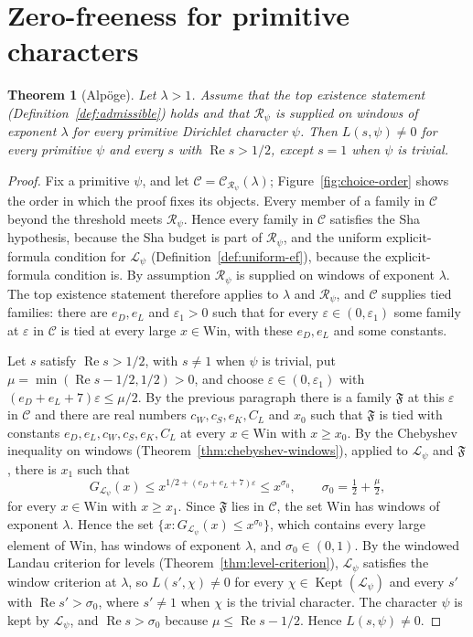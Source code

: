 \documentclass[11pt]{amsbook}
\theoremstyle{plain}
\newtheorem{theorem}{Theorem}[section]
\theoremstyle{definition}
\theoremstyle{remark}
\numberwithin{equation}{section}
\numberwithin{figure}{chapter}
\numberwithin{table}{chapter}
\newcommand{\eps}{\varepsilon}
\newcommand{\lev}{\mathscr{L}}
\newcommand{\Kept}{\operatorname{Kept}}
\newcommand{\Fam}{\mathfrak{F}}
\newcommand{\Win}{\mathrm{Win}}
\begin{document}
\section{Zero-freeness for primitive characters}

\begin{theorem}[Alp\"oge]\label{thm:zero-free-primitive}
Let $\lambda>1$. Assume that the top existence statement
(Definition~\ref{def:admissible}) holds and that
$\mathscr R_\psi$ is supplied on windows of exponent $\lambda$ for every
primitive
Dirichlet character $\psi$. Then $L(s,\psi)\ne0$ for every primitive
$\psi$ and every $s$ with $\operatorname{Re}s>1/2$, except $s=1$ when
$\psi$ is trivial.
\end{theorem}

\begin{proof}
Fix a primitive $\psi$, and let $\mathcal C=\mathcal C
_{\mathscr R_\psi}(\lambda)$; Figure~\ref{fig:choice-order} shows the order in which the proof fixes its objects. Every member of a family in
$\mathcal C$ beyond the threshold meets $\mathscr R_\psi$. Hence every
family in $\mathcal C$ satisfies the Sha hypothesis, because the Sha
budget is part of $\mathscr R_\psi$, and the uniform explicit-formula
condition for $\lev_\psi$ (Definition~\ref{def:uniform-ef}), because
the explicit-formula condition is. By assumption $\mathscr R_\psi$ is
supplied on windows of exponent $\lambda$. The top existence statement
therefore applies to $\lambda$ and $\mathscr R_\psi$, and $\mathcal C$
supplies tied families: there are $e_D,e_L$ and $\eps_1>0$ such that
for every $\eps\in(0,\eps_1)$ some family at $\eps$ in $\mathcal C$ is
tied at every large $x\in\Win$, with these $e_D,e_L$ and some
constants.

Let $s$ satisfy $\operatorname{Re}s>1/2$, with $s\ne1$ when $\psi$ is
trivial, put $\mu=\min(\operatorname{Re}s-1/2,1/2)>0$, and choose
$\eps\in(0,\eps_1)$ with $(e_D+e_L+7)\eps\le\mu/2$. By the previous
paragraph there is a family $\Fam$ at this $\eps$ in $\mathcal C$ and
there are real numbers $c_W,c_S,e_K,C_L$ and $x_0$ such that $\Fam$ is
tied with constants $e_D,e_L,c_W,c_S,e_K,C_L$ at every $x\in\Win$ with
$x\ge x_0$. By the Chebyshev inequality on windows
(Theorem~\ref{thm:chebyshev-windows}), applied to $\lev_\psi$ and
$\Fam$, there is $x_1$ such that
\[
G_{\lev_\psi}(x)\le x^{1/2+(e_D+e_L+7)\eps}\le x^{\sigma_0},
\qquad \sigma_0=\tfrac12+\tfrac\mu2,
\]
for every $x\in\Win$ with $x\ge x_1$. Since $\Fam$ lies in
$\mathcal C$, the set $\Win$ has windows of exponent $\lambda$. Hence
the set $\{x:G_{\lev_\psi}(x)\le x^{\sigma_0}\}$, which contains every
large element of $\Win$, has windows of exponent $\lambda$, and
$\sigma_0\in(0,1)$. By the windowed Landau criterion for levels
(Theorem~\ref{thm:level-criterion}), $\lev_\psi$ satisfies the window
criterion at $\lambda$, so $L(s',\chi)\ne0$ for every
$\chi\in\Kept(\lev_\psi)$ and every $s'$ with
$\operatorname{Re}s'>\sigma_0$, where $s'\ne1$ when $\chi$ is the
trivial character. The character $\psi$ is
kept by $\lev_\psi$, and $\operatorname{Re}s>\sigma_0$ because
$\mu\le\operatorname{Re}s-1/2$. Hence $L(s,\psi)\ne0$.
\end{proof}
\end{document}
